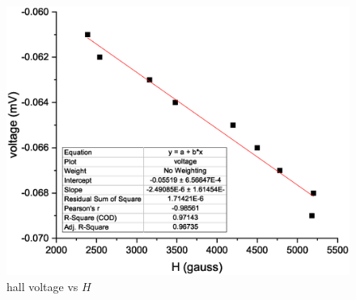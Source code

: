 \begin{figure}[]
    \centering
    \includegraphics[width=0.95\columnwidth]{images/Graph6.eps}
    \caption{hall voltage vs $H$}
    \label{fig:graph6}
\end{figure}